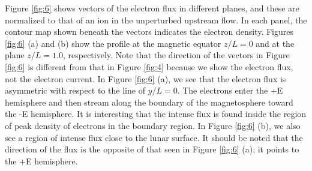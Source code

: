 \documentclass[draft,jgrga]{agutex2015}
\begin{document}
\begin{article}
Figure \ref{fig:6} shows vectors of the electron flux in different planes, and these are
normalized to that of an ion in the unperturbed upstream flow.
%
In each panel, the contour map shown beneath the vectors indicates the electron density.
Figures \ref{fig:6} (a) and (b) show the profile 
at the magnetic equator $z/L=0$ and at the plane $z/L=1.0$, respectively. 
Note that the direction of the vectors in Figure \ref{fig:6} is
different from that in Figure \ref{fig:4} because 
we show the electron flux, not the electron current.
In Figure \ref{fig:6} (a),  
we see that the electron flux is asymmetric with respect to the line of $y/L=0$.
The electrons enter the +E hemisphere  
and then stream along the boundary of the magnetosphere toward the -E hemisphere.
It is interesting that the intense flux is found inside the region of peak density of electrons in the boundary region.
In Figure \ref{fig:6} (b),
we also see a region of intense flux close to the lunar surface.
It should be noted that the direction of the flux is the 
opposite of that seen in Figure \ref{fig:6} (a); it points to the +E hemisphere.


\end{article}
\end{document}
